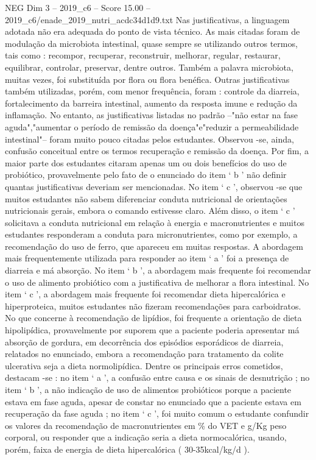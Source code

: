 \begin{textsample}{NEG Dim 3 – 2019\_c6 – Score 15.00 – 2019\_c6/enade\_2019\_nutri\_acdc34d1d9.txt}
Nas justificativas, a linguagem adotada não era adequada do ponto de vista técnico.
As mais citadas foram de modulação da microbiota intestinal, quase sempre se utilizando outros termos, tais como : recompor, recuperar, reconstruir, melhorar, regular, restaurar, equilibrar, controlar, preservar, dentre outros.
Também a palavra microbiota, muitas vezes, foi substituída por flora ou flora benéfica.
Outras justificativas também utilizadas, porém, com menor frequência, foram : controle da diarreia, fortalecimento da barreira intestinal, aumento da resposta imune e redução da inflamação.
No entanto, as justificativas listadas no padrão –"não estar na fase aguda","aumentar o período de remissão da doença"e"reduzir a permeabilidade intestinal"– foram muito pouco citadas pelos estudantes.
Observou -se, ainda, confusão conceitual entre os termos recuperação e remissão da doença.
Por fim, a maior parte dos estudantes citaram apenas um ou dois benefícios do uso de probiótico, provavelmente pelo fato de o enunciado do item ‘ b ’ não definir quantas justificativas deveriam ser mencionadas.
No item ‘ c ’, observou -se que muitos estudantes não sabem diferenciar conduta nutricional de orientações nutricionais gerais, embora o comando estivesse claro.
Além disso, o item ‘ c ’ solicitava a conduta nutricional em relação à energia e macronutrientes e muitos estudantes responderam a conduta para micronutrientes, como por exemplo, a recomendação do uso de ferro, que apareceu em muitas respostas.
A abordagem mais frequentemente utilizada para responder ao item ‘ a ’ foi a presença de diarreia e má absorção.
No item ‘ b ’, a abordagem mais frequente foi recomendar o uso de alimento probiótico com a justificativa de melhorar a flora intestinal.
No item ‘ c ’, a abordagem mais frequente foi recomendar dieta hipercalórica e hiperproteica, muitos estudantes não fizeram recomendações para carboidratos.
No que concerne à recomendação de lipídios, foi frequente a orientação de dieta hipolipídica, provavelmente por suporem que a paciente poderia apresentar má absorção de gordura, em decorrência dos episódios esporádicos de diarreia, relatados no enunciado, embora a recomendação para tratamento da colite ulcerativa seja a dieta normolipídica.
Dentre os principais erros cometidos, destacam -se : no item ‘ a ’, a confusão entre causa e os sinais de desnutrição ; no item ‘ b ’, a não indicação de uso de alimentos probióticos porque a paciente estava em fase aguda, apesar de constar no enunciado que a paciente estava em recuperação da fase aguda ; no item ‘ c ’, foi muito comum o estudante confundir os valores da recomendação de macronutrientes em \% do VET e g/Kg peso corporal, ou responder que a indicação seria a dieta normocalórica, usando, porém, faixa de energia de dieta hipercalórica ( 30-35kcal/kg/d ).

\end{textsample}
